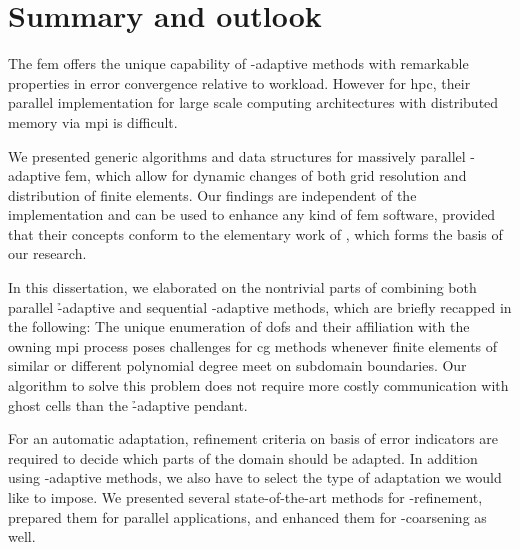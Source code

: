 \chapter{Summary and outlook}
\label{ch:summary}
\glsresetall


The \gls{fem} offers the unique capability of \hp-adaptive methods with remarkable properties in error convergence relative to workload. However for \gls{hpc}, their parallel implementation for large scale computing architectures with distributed memory via \gls{mpi} is difficult.

We presented generic algorithms and data structures for massively parallel \hp-adaptive \gls{fem}, which allow for dynamic changes of both grid resolution and distribution of finite elements. Our findings are independent of the implementation and can be used to enhance any kind of \gls{fem} software, provided that their concepts conform to the elementary work of \textcite{bangerth2009,bangerth2012}, which forms the basis of our research.




In this dissertation, we elaborated on the nontrivial parts of combining both parallel \h-adaptive and sequential \hp-adaptive methods, which are briefly recapped in the following:
The unique enumeration of \glspl{dof} and their affiliation with the owning \gls{mpi} process poses challenges for \gls{cg} methods whenever finite elements of similar or different polynomial degree meet on subdomain boundaries. Our algorithm to solve this problem does not require more costly communication with ghost cells than the \h-adaptive pendant.

For an automatic adaptation, refinement criteria on basis of error indicators are required to decide which parts of the domain should be adapted. In addition using \hp-adaptive methods, we also have to select the type of adaptation we would like to impose.
We presented several state-of-the-art methods for \hp-refinement, prepared them for parallel applications, and enhanced them for \hp-coarsening as well.

